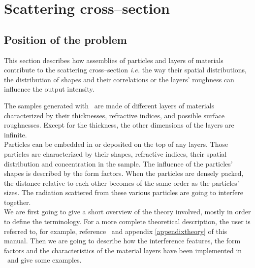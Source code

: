 

\chapter{Scattering cross--section}  

\section{Position of the problem} 

This section describes how assemblies of particles and layers of materials contribute to the scattering cross--section \textit{i.e.} the way their spatial distributions, the distribution of shapes and their correlations or the layers' roughness can influence the output intensity. 

The samples generated with \BornAgain\ are made of different layers of materials characterized by their thicknesses, refractive indices, and possible surface roughnesses. Except for the thickness, the other dimensions of the layers are infinite.\\ Particles can be embedded in or deposited on the top of any layers. Those particles are characterized by their shapes, refractive indices, their spatial distribution and concentration in the sample. The influence of the particles' shapes is described by the form factors. When the particles are densely packed, the distance relative to each other becomes of the same order as the particles' sizes. The radiation scattered from these various particles are going to interfere together. \\ We are first going to give a short overview of the theory involved, mostly in order to define the terminology. For a more complete theoretical description, the user is referred to, for example, reference~\cite{ReLL09} and appendix \ref{appendixtheory} of this manual. Then we are going to describe how the interference features, the form factors and the characteristics of the material layers have been implemented in \BornAgain\ and  give some examples.


